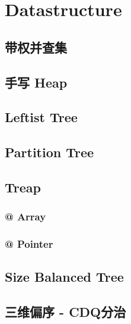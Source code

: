 \section{Datastructure}
	\subsection{带权并查集}
		
	\subsection{手写 Heap}
		
	\subsection{Leftist Tree}
		
	\subsection{Partition Tree}
		
	\subsection{Treap}
		\subsubsection{@ Array}
			
		\subsubsection{@ Pointer}
			
	\subsection{Size Balanced Tree}
		
	\subsection{三维偏序 - CDQ分治}
		
